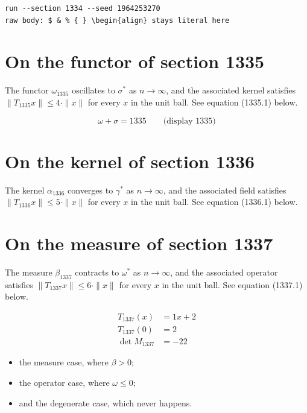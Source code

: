 \documentclass{article}
\begin{document}
\begin{verbatim}
run --section 1334 --seed 1964253270
raw body: $ & % { } \begin{align} stays literal here
\end{verbatim}

\section{On the functor of section 1335}
The functor $\omega_{1335}$ oscillates to $\sigma^{*}$ as $n \to \infty$,
and the associated kernel satisfies $\|T_{1335} x\| \leq 4 \cdot \|x\|$
for every $x$ in the unit ball. See equation (1335.1) below.

$$
\omega + \sigma = 1335 \qquad \text{(display 1335)}
$$

\section{On the kernel of section 1336}
The kernel $\alpha_{1336}$ converges to $\gamma^{*}$ as $n \to \infty$,
and the associated field satisfies $\|T_{1336} x\| \leq 5 \cdot \|x\|$
for every $x$ in the unit ball. See equation (1336.1) below.

\section{On the measure of section 1337}
The measure $\beta_{1337}$ contracts to $\omega^{*}$ as $n \to \infty$,
and the associated operator satisfies $\|T_{1337} x\| \leq 6 \cdot \|x\|$
for every $x$ in the unit ball. See equation (1337.1) below.

\begin{align}
T_{1337}(x) &= 1 x + 2 \\
T_{1337}(0) &= 2 \\
\det M_{1337} &= -22
\end{align}

\begin{itemize}
  \item the measure case, where $\beta > 0$;
  \item the operator case, where $\omega \leq 0$;
  \item and the degenerate case, which never happens.
\end{itemize}
\end{document}
